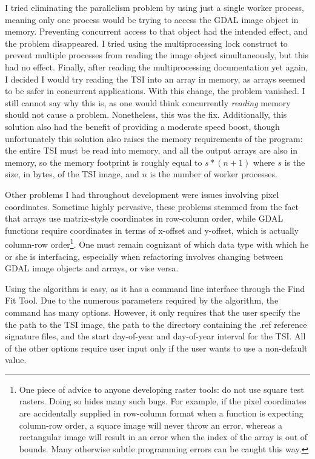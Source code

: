 I tried eliminating the parallelism problem by using just a single worker process, meaning only one process would be trying to access the GDAL image object in memory. Preventing concurrent access to that object had the intended effect, and the problem disappeared. I tried using the multiprocessing lock construct to prevent multiple processes from reading the image object simultaneously, but this had no effect. Finally, after reading the multiprocessing documentation yet again, I decided I would try reading the TSI into an array in memory, as arrays seemed to be safer in concurrent applications. With this change, the problem vanished. I still cannot say why this is, as one would think concurrently \textit{reading} memory should not cause a problem. Nonetheless, this was the fix. Additionally, this solution also had the benefit of providing a moderate speed boost, though unfortunately this solution also raises the memory requirements of the program: the entire TSI must be read into memory, and all the output arrays are also in memory, so the memory footprint is roughly equal to $s * (n + 1)$ where $s$ is the size, in bytes, of the TSI image, and $n$ is the number of worker processes.

Other problems I had throughout development were issues involving pixel coordinates. Sometime highly pervasive, these problems stemmed from the fact that arrays use matrix-style coordinates in row-column order, while GDAL functions require coordinates in terms of x-offset and y-offset, which is actually column-row order\footnote{One piece of advice to anyone developing raster tools: do not use square test rasters. Doing so hides many such bugs. For example, if the pixel coordinates are accidentally supplied in row-column format when a function is expecting column-row order, a square image will never throw an error, whereas a rectangular image will result in an error when the index of the array is out of bounds. Many otherwise subtle programming errors can be caught this way.}. One must remain cognizant of which data type with which he or she is interfacing, especially when refactoring involves changing between GDAL image objects and arrays, or vise versa.

Using the algorithm is easy, as it has a command line interface through the Find Fit Tool. Due to the numerous parameters required by the algorithm, the command has many options. However, it only requires that the user specify the the path to the TSI image, the path to the directory containing the .ref reference signature files, and the start day-of-year and day-of-year interval for the TSI. All of the other options require user input only if the user wants to use a non-default value.

